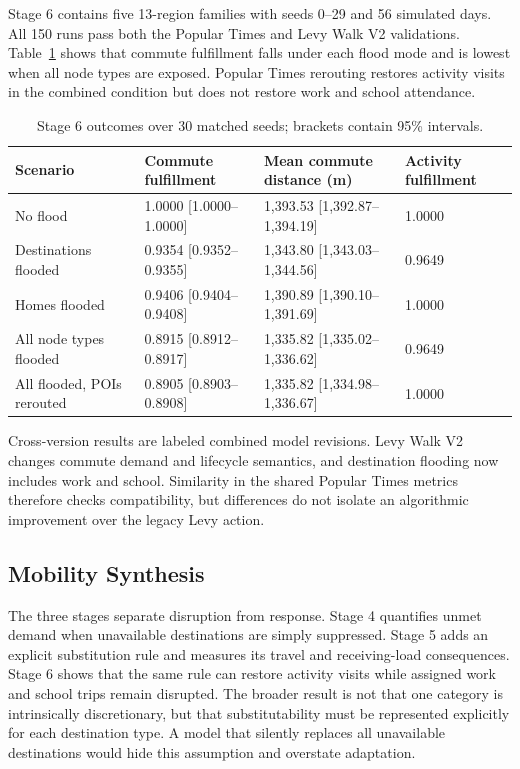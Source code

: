 \documentclass[pdflatex,sn-mathphys-num]{sn-jnl}%
\theoremstyle{thmstyleone}%
\theoremstyle{thmstyletwo}%
\theoremstyle{thmstylethree}%
\begin{document}
Stage 6 contains five 13-region families with seeds 0--29 and 56 simulated days. All 150 runs pass both the Popular Times and Levy Walk V2 validations. Table~\ref{tbl:levy_v2} shows that commute fulfillment falls under each flood mode and is lowest when all node types are exposed. Popular Times rerouting restores activity visits in the combined condition but does not restore work and school attendance.

\begin{table}[ht]
\centering
\footnotesize
\caption{Stage 6 outcomes over 30 matched seeds; brackets contain 95\% intervals.}
\label{tbl:levy_v2}
\begin{tabularx}{\linewidth}{@{}lXXX@{}}
\toprule
\textbf{Scenario} & \textbf{Commute fulfillment} & \textbf{Mean commute distance (m)} & \textbf{Activity fulfillment} \\ \midrule
No flood & 1.0000 [1.0000--1.0000] & 1,393.53 [1,392.87--1,394.19] & 1.0000 \\ 
Destinations flooded & 0.9354 [0.9352--0.9355] & 1,343.80 [1,343.03--1,344.56] & 0.9649 \\ 
Homes flooded & 0.9406 [0.9404--0.9408] & 1,390.89 [1,390.10--1,391.69] & 1.0000 \\ 
All node types flooded & 0.8915 [0.8912--0.8917] & 1,335.82 [1,335.02--1,336.62] & 0.9649 \\ 
All flooded, POIs rerouted & 0.8905 [0.8903--0.8908] & 1,335.82 [1,334.98--1,336.67] & 1.0000 \\ \bottomrule
\end{tabularx}
\end{table}

Cross-version results are labeled combined model revisions. Levy Walk V2 changes commute demand and lifecycle semantics, and destination flooding now includes work and school. Similarity in the shared Popular Times metrics therefore checks compatibility, but differences do not isolate an algorithmic improvement over the legacy Levy action.

\subsection{Mobility Synthesis}

The three stages separate disruption from response. Stage 4 quantifies unmet demand when unavailable destinations are simply suppressed. Stage 5 adds an explicit substitution rule and measures its travel and receiving-load consequences. Stage 6 shows that the same rule can restore activity visits while assigned work and school trips remain disrupted. The broader result is not that one category is intrinsically discretionary, but that substitutability must be represented explicitly for each destination type. A model that silently replaces all unavailable destinations would hide this assumption and overstate adaptation.
\end{document}
